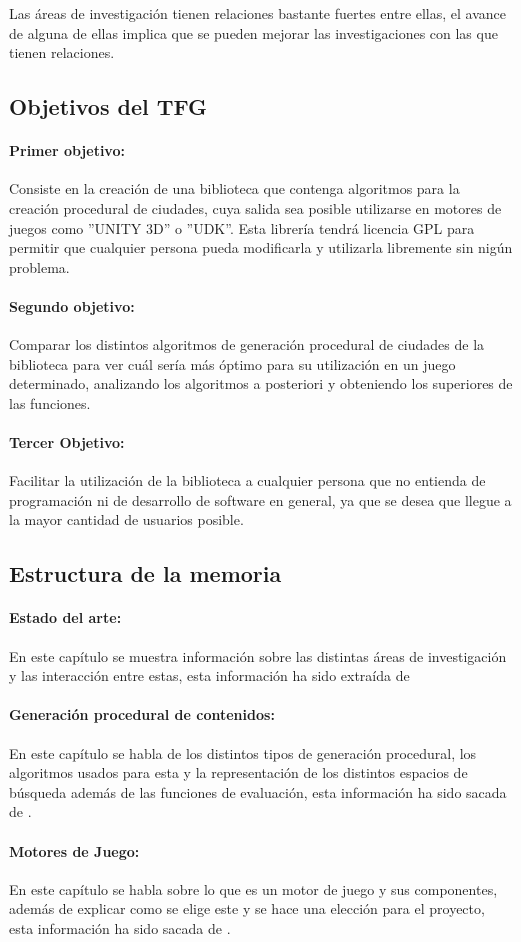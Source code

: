 Las áreas de investigación tienen relaciones bastante fuertes entre ellas, el avance de alguna de ellas implica que se pueden mejorar las investigaciones con las que tienen relaciones.


\subsection*{Objetivos del TFG}

\paragraph*{Primer objetivo:}
Consiste en la creación de una biblioteca que contenga algoritmos para la creación procedural de ciudades, cuya salida sea posible utilizarse en motores de juegos como ''UNITY 3D'' o ''UDK''. Esta librería tendrá licencia GPL para permitir que cualquier persona pueda modificarla y utilizarla libremente sin nigún problema.

\paragraph*{Segundo objetivo:}
Comparar los distintos algoritmos de generación procedural de ciudades de la biblioteca para ver cuál sería más óptimo para su utilización en un juego determinado, analizando los algoritmos a posteriori y obteniendo los superiores de las funciones.

\paragraph*{Tercer Objetivo:}
Facilitar la utilización de la biblioteca a cualquier persona que no entienda de programación ni de desarrollo de software en general, ya que se desea que llegue a la mayor cantidad de usuarios posible.

%
%
\subsection*{Estructura de la memoria}

\paragraph*{Estado del arte:}
En este capítulo se muestra información sobre las distintas áreas de investigación y las interacción entre estas, esta información ha sido extraída de \cite{B1}

\paragraph*{Generación procedural de contenidos:}
En este capítulo se habla de los distintos tipos de generación procedural, los algoritmos usados para esta y la representación de los distintos espacios de búsqueda además de las funciones de evaluación, esta información ha sido sacada de \cite{B1}\cite{B2}\cite{B3}\cite{B4}\cite{B5}\cite{B6}\cite{B7}\cite{B8}.

\paragraph*{Motores de Juego:}
En este capítulo se habla sobre lo que es un motor de juego y sus componentes, además de explicar como se elige este y se hace una elección para el proyecto, esta información ha sido sacada de \cite{B9}\cite{B10}\cite{B11}.
